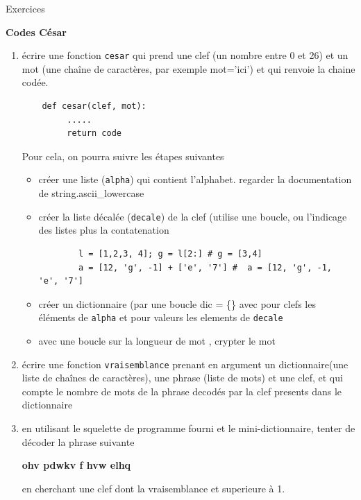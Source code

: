 \documentclass[11pt]{letter}
\begin{document}

\begin{center}
{\Large Exercices  }
\end{center}

\textbf{Codes César}
\begin{enumerate}
   \item écrire une fonction \texttt{cesar} qui prend une clef (un nombre entre 0 et 26) et un mot (une chaîne de caractères, par exemple mot='ici')
   et qui renvoie la chaine codée. 
   \begin{lstlisting}
    def cesar(clef, mot):
         .....
         return code
   \end{lstlisting}
   Pour cela, on pourra suivre les étapes suivantes 
    \begin{itemize}
      \item créer une liste (\texttt{alpha}) qui contient l'alphabet. regarder la documentation de string.ascii\_lowercase
      \item créer la liste décalée (\texttt{decale}) de la clef (utilise une boucle, ou l'indicage des listes plus la contatenation 
      \begin{lstlisting}
        l = [1,2,3, 4]; g = l[2:] # g = [3,4]
        a = [12, 'g', -1] + ['e', '7'] #  a = [12, 'g', -1, 'e', '7']
       \end{lstlisting}
      \item créer un dictionnaire (par une boucle dic = \{\} avec pour clefs les éléments de \texttt{alpha} et pour valeurs les
      elements de \texttt{decale}
      \item avec une boucle sur la longueur de mot , crypter le mot
    \end{itemize}
   \item écrire une fonction \texttt{vraisemblance} prenant en argument un dictionnaire(une liste de chaînes de caractères), une phrase (liste
   de mots) et une clef, et qui compte le nombre de mots de la phrase decodés par la clef presents dans le dictionnaire
   \item en utilisant le squelette de programme fourni et le mini-dictionnaire, tenter de décoder la phrase suivante \\
   \begin{center}
   {\large \bf ohv pdwkv f hvw elhq} 
   \end{center} 
  

   en cherchant une clef dont la vraisemblance et superieure à 1.
\end{enumerate}
\end{document}
